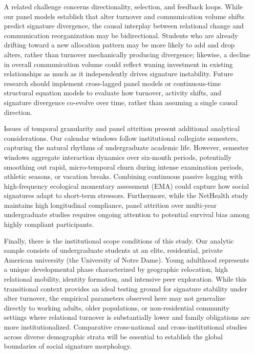 \documentclass[11pt,letterpaper]{article}
\begin{document}
A related challenge concerns directionality, selection, and feedback loops. While our panel models establish that alter turnover and communication volume shifts predict signature divergence, the causal interplay between relational change and communication reorganization may be bidirectional. Students who are already drifting toward a new allocation pattern may be more likely to add and drop alters, rather than turnover mechanically producing divergence; likewise, a decline in overall communication volume could reflect waning investment in existing relationships as much as it independently drives signature instability. Future research should implement cross-lagged panel models or continuous-time structural equation models to evaluate how turnover, activity shifts, and signature divergence co-evolve over time, rather than assuming a single causal direction.

Issues of temporal granularity and panel attrition present additional analytical considerations. Our calendar windows follow institutional collegiate semesters, capturing the natural rhythms of undergraduate academic life. However, semester windows aggregate interaction dynamics over six-month periods, potentially smoothing out rapid, micro-temporal churn during intense examination periods, athletic seasons, or vacation breaks. Combining continuous passive logging with high-frequency ecological momentary assessment (EMA) could capture how social signatures adapt to short-term stressors. Furthermore, while the NetHealth study maintains high longitudinal compliance, panel attrition over multi-year undergraduate studies requires ongoing attention to potential survival bias among highly compliant participants.

Finally, there is the institutional scope conditions of this study. Our analytic sample consists of undergraduate students at an elite, residential, private American university (the University of Notre Dame). Young adulthood represents a unique developmental phase characterized by geographic relocation, high relational mobility, identity formation, and intensive peer exploration. While this transitional context provides an ideal testing ground for signature stability under alter turnover, the empirical parameters observed here may not generalize directly to working adults, older populations, or non-residential community settings where relational turnover is substantially lower and family obligations are more institutionalized. Comparative cross-national and cross-institutional studies across diverse demographic strata will be essential to establish the global boundaries of social signature morphology.
\end{document}
